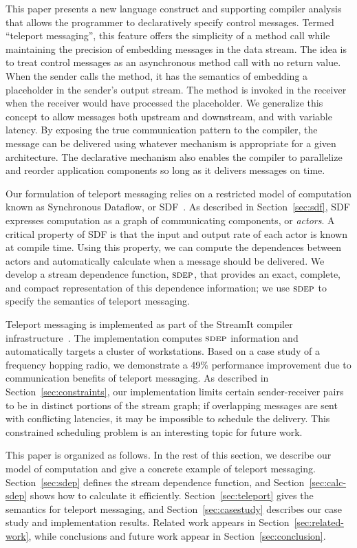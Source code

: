 \documentclass{sig-alternate}
\begin{document}
This paper presents a new language construct and supporting compiler
analysis that allows the programmer to declaratively specify control
messages.  Termed ``teleport messaging'', this feature offers the
simplicity of a method call while maintaining the precision of
embedding messages in the data stream.  The idea is to treat control
messages as an asynchronous method call with no return value.  When
the sender calls the method, it has the semantics of embedding a
placeholder in the sender's output stream.  The method is invoked in
the receiver when the receiver would have processed the placeholder.
We generalize this concept to allow messages both upstream and
downstream, and with variable latency.  By exposing the true
communication pattern to the compiler, the message can be delivered
using whatever mechanism is appropriate for a given architecture.  The
declarative mechanism also enables the compiler to parallelize and
reorder application components so long as it delivers messages on
time.

Our formulation of teleport messaging relies on a restricted model of
computation known as Synchronous Dataflow, or SDF~\cite{LM87-i}.  As
described in Section~\ref{sec:sdf}, SDF expresses computation as a
graph of communicating components, or {\it actors}.  A critical
property of SDF is that the input and output rate of each actor is
known at compile time.  Using this property, we can compute the
dependences between actors and automatically calculate when a message
should be delivered.  We develop a stream dependence function,
$\textsc{sdep}$, that provides an exact, complete, and compact representation
of this dependence information; we use $\textsc{sdep}$ to specify the
semantics of teleport messaging.

Teleport messaging is implemented as part of the StreamIt compiler
infrastructure~\cite{streamitcc}.  The implementation computes $\textsc{sdep}$
information and automatically targets a cluster of workstations.
Based on a case study of a frequency hopping radio, we demonstrate a
49\% performance improvement due to communication benefits of teleport
messaging.  As described in Section~\ref{sec:constraints}, our
implementation limits certain sender-receiver pairs to be in distinct
portions of the stream graph; if overlapping messages are sent with
conflicting latencies, it may be impossible to schedule the delivery.
This constrained scheduling problem is an interesting topic for future
work.

This paper is organized as follows.  In the rest of this
section, we describe our model of computation and give a concrete
example of teleport messaging.  Section~\ref{sec:sdep} defines the
stream dependence function, and Section~\ref{sec:calc-sdep} shows how
to calculate it efficiently.  Section~\ref{sec:teleport} gives the
semantics for teleport messaging, and Section~\ref{sec:casestudy}
describes our case study and implementation results.  
Related work appears in Section~\ref{sec:related-work}, while
conclusions and future work appear in Section~\ref{sec:conclusion}.
\end{document}

